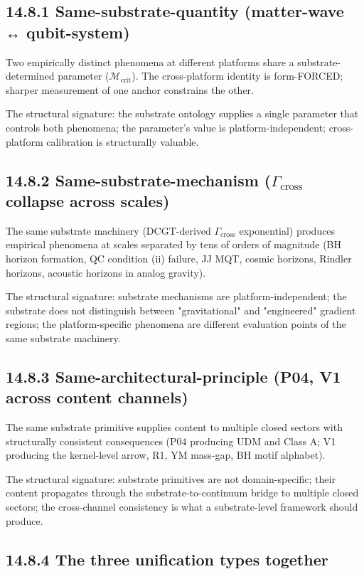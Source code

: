 \documentclass[11pt]{book}
\begin{document}
\subsection{14.8.1 Same-substrate-quantity (matter-wave ↔ qubit-system)}

Two empirically distinct phenomena at different platforms share a substrate-determined parameter ($\mathcal{M}_\mathrm{crit}$). The cross-platform identity is form-FORCED; sharper measurement of one anchor constrains the other.

The structural signature: the substrate ontology supplies a single parameter that controls both phenomena; the parameter's value is platform-independent; cross-platform calibration is structurally valuable.

\subsection{14.8.2 Same-substrate-mechanism ($\Gamma_\mathrm{cross}$ collapse across scales)}

The same substrate machinery (DCGT-derived $\Gamma_\mathrm{cross}$ exponential) produces empirical phenomena at scales separated by tens of orders of magnitude (BH horizon formation, QC condition (ii) failure, JJ MQT, cosmic horizons, Rindler horizons, acoustic horizons in analog gravity).

The structural signature: substrate mechanisms are platform-independent; the substrate does not distinguish between "gravitational" and "engineered" gradient regions; the platform-specific phenomena are different evaluation points of the same substrate machinery.

\subsection{14.8.3 Same-architectural-principle (P04, V1 across content channels)}

The same substrate primitive supplies content to multiple closed sectors with structurally consistent consequences (P04 producing UDM and Class A; V1 producing the kernel-level arrow, R1, YM mass-gap, BH motif alphabet).

The structural signature: substrate primitives are not domain-specific; their content propagates through the substrate-to-continuum bridge to multiple closed sectors; the cross-channel consistency is what a substrate-level framework should produce.

\subsection{14.8.4 The three unification types together}
\end{document}
